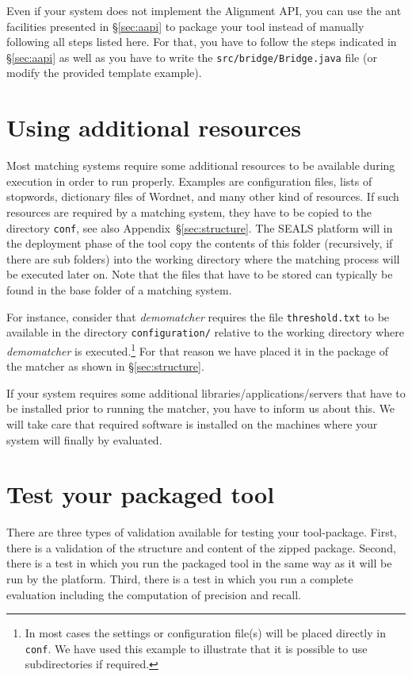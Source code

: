 \documentclass{article}
\def\file#1{\textcolor{grayy}{\texttt{#1}}}
\def\tool#1{\textsl{#1}}
\begin{document}
Even if your system does not implement the Alignment API, you can use the ant facilities presented in \S\ref{sec:aapi} to package your tool instead of manually following all steps listed here. For that, you have to follow the steps indicated in \S\ref{sec:aapi} as well as you have to write the \file{src/bridge/Bridge.java} file (or modify the provided template example).

\section{Using additional resources}
\label{sec:resources}

Most matching systems require some additional resources to be available during execution in order to run properly. Examples are configuration files, lists of stopwords, dictionary files of Wordnet, and many other kind of resources. If such resources are required by a matching system, they have to be copied to the directory \file{conf}, see also Appendix~\S\ref{sec:structure}. The SEALS platform will in the deployment phase of the tool copy the contents of this folder (recursively, if there are sub folders) into the working directory where the matching process will be executed later on. Note that the files that have to be stored can typically be found in the base folder of a matching system. 


For instance, consider that \tool{demomatcher} requires the file \file{threshold.txt} to be available in the directory \file{configuration/} relative to the working directory where \tool{demomatcher} is executed.\footnote{In most cases the settings or configuration file(s) will be placed directly in \file{conf}. We have used this example to illustrate that it is possible to use subdirectories if required.} For that reason we have placed it in the package of the matcher as shown in \S\ref{sec:structure}. 

If your system requires some additional libraries/applications/servers that have to be installed prior to running the matcher, you have to inform us about this. We will take care that required software is installed on the machines where your system will finally by evaluated.

\section{Test your packaged tool}
\label{sec:test}

There are three types of validation available for testing your tool-package. First, there is a validation of the structure and content of the zipped package. Second, there is a test in which you run the packaged tool in the same way as it will be run by the platform. Third, there is a test in which you run a complete evaluation including the computation of precision and recall. 
\end{document}
